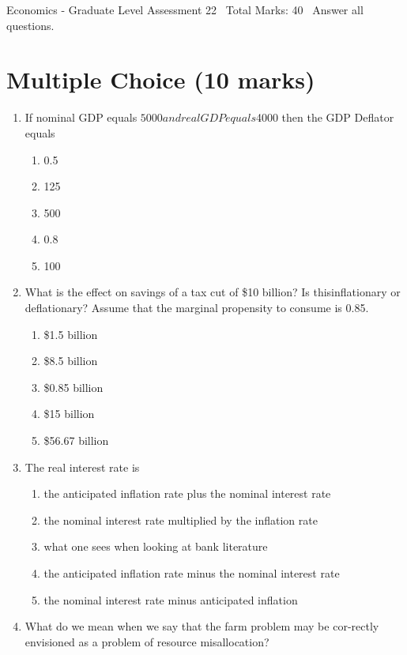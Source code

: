 \documentclass[12pt]{article}
\begin{document}
\begin{center}
Economics - Graduate Level Assessment 22 \
Total Marks: 40 \
Answer all questions.
\end{center}

\section*{Multiple Choice (10 marks)}
\begin{enumerate}[label=\arabic*.]
\item If nominal GDP equals $5000 and real GDP equals $4000 then the GDP Deflator equals
\begin{enumerate}[label=(\alph*)]
    \item 0.5
    \item 125
    \item 500
    \item 0.8
    \item 100
\end{enumerate}
\item What is the effect on savings of a tax cut of \$10 billion? Is thisinflationary or deflationary? Assume that the marginal propensity to consume is 0.85.
\begin{enumerate}[label=(\alph*)]
    \item \$1.5 billion
    \item \$8.5 billion
    \item \$0.85 billion
    \item \$15 billion
    \item \$56.67 billion
\end{enumerate}
\item The real interest rate is
\begin{enumerate}[label=(\alph*)]
    \item the anticipated inflation rate plus the nominal interest rate
    \item the nominal interest rate multiplied by the inflation rate
    \item what one sees when looking at bank literature
    \item the anticipated inflation rate minus the nominal interest rate
    \item the nominal interest rate minus anticipated inflation
\end{enumerate}
\item What do we mean when we say that the farm problem may be cor-rectly envisioned as a problem of resource misallocation?
\begin{enumerate}[label=(\alph*)]

\end{enumerate}
\end{enumerate}
\end{document}
